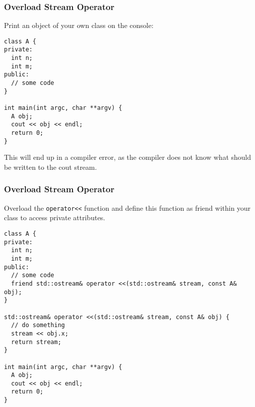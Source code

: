 \begin{frame}[fragile]
\frametitle{Overload Stream Operator}
Print an object of your own class on the console:

{\tiny
\begin{lstlisting}
class A {
private:
  int n;
  int m;
public:
  // some code
}

int main(int argc, char **argv) {
  A obj;
  cout << obj << endl;
  return 0;
}
\end{lstlisting}
}
This will end up in a compiler error, as the compiler does not know what should be
written to the cout stream.
\end{frame}

\begin{frame}[fragile]
\frametitle{Overload Stream Operator}
Overload the \verb|operator<<| function and define this function as friend
within your class to access private attributes.

{\tiny
\begin{lstlisting}
class A {
private:
  int n;
  int m;
public:
  // some code
  friend std::ostream& operator <<(std::ostream& stream, const A& obj);
}

std::ostream& operator <<(std::ostream& stream, const A& obj) {
  // do something
  stream << obj.x;
  return stream;
}

int main(int argc, char **argv) {
  A obj;
  cout << obj << endl;
  return 0;
}
\end{lstlisting}
}
\end{frame}
